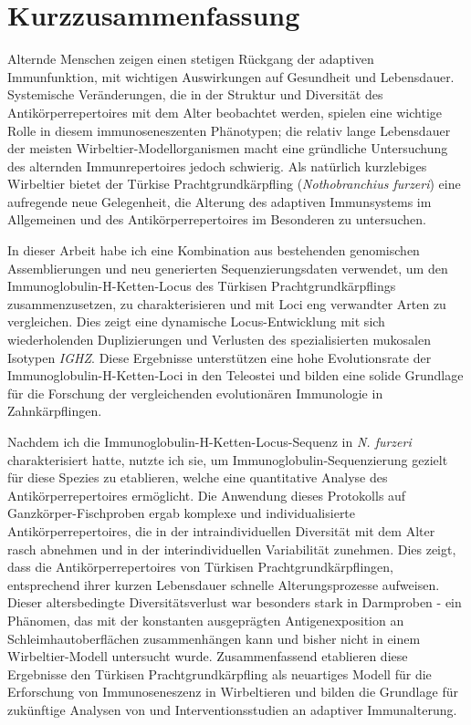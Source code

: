 {
\cleardoublepage
\setsinglecolumn
\chapter*{\centering \LARGE Kurzzusammenfassung}
\thispagestyle{empty}
Alternde Menschen zeigen einen stetigen R\"uckgang der adaptiven Immunfunktion, mit wichtigen Auswirkungen auf Gesundheit und Lebensdauer. Systemische Ver\"anderungen, die in der Struktur und Diversit\"at des Antik\"orperrepertoires mit dem Alter beobachtet werden, spielen eine wichtige Rolle in diesem immunoseneszenten Ph\"anotypen; die relativ lange Lebensdauer der meisten Wirbeltier-Modellorganismen macht eine gr\"undliche Untersuchung des alternden Immunrepertoires jedoch schwierig. Als nat\"urlich kurzlebiges Wirbeltier bietet der T\"urkise Prachtgrundk\"arpfling (\textit{Nothobranchius furzeri}) eine aufregende neue Gelegenheit, die Alterung des adaptiven Immunsystems im Allgemeinen und des Antik\"orperrepertoires im Besonderen zu untersuchen.

In dieser Arbeit habe ich eine Kombination aus bestehenden genomischen Assemblierungen und neu generierten Sequenzierungsdaten verwendet, um den Immunoglobulin-H-Ketten-Locus des T\"urkisen Prachtgrundk\"arpflings zusammenzusetzen, zu charakterisieren und mit Loci eng verwandter Arten zu vergleichen. Dies zeigt eine dynamische Locus-Entwicklung mit sich wiederholenden Duplizierungen und Verlusten des spezialisierten mukosalen Isotypen \textit{IGHZ}. Diese Ergebnisse unterst\"utzen eine hohe Evolutionsrate der Immunoglobulin-H-Ketten-Loci in den Teleostei und bilden eine solide Grundlage f\"ur die Forschung der vergleichenden evolution\"aren Immunologie in Zahnk\"arpflingen.

Nachdem ich die Immunoglobulin-H-Ketten-Locus-Sequenz in \textit{N. furzeri} charakterisiert hatte, nutzte ich sie, um Immunoglobulin-Sequenzierung gezielt f\"ur diese Spezies zu etablieren, welche eine quantitative Analyse des Antik\"orperrepertoires erm\"oglicht. Die Anwendung dieses Protokolls auf Ganzk\"orper-Fischproben ergab komplexe und individualisierte Antik\"orperrepertoires, die in der intraindividuellen Diversit\"at mit dem Alter rasch abnehmen und in der interindividuellen Variabilit\"at zunehmen. Dies zeigt, dass die Antik\"orperrepertoires von T\"urkisen Prachtgrundk\"arpflingen, entsprechend ihrer kurzen Lebensdauer schnelle Alterungsprozesse aufweisen. Dieser altersbedingte Diversit\"atsverlust war besonders stark in Darmproben - ein Ph\"anomen, das mit der konstanten ausgepr\"agten Antigenexposition an Schleimhautoberfl\"achen zusammenh\"angen kann und bisher nicht in einem Wirbeltier-Modell untersucht wurde. Zusammenfassend etablieren diese Ergebnisse den T\"urkisen Prachtgrundk\"arpfling als neuartiges Modell f\"ur die Erforschung von Immunoseneszenz in Wirbeltieren und bilden die Grundlage f\"ur zuk\"unftige Analysen von und Interventionsstudien an adaptiver Immunalterung.
}
